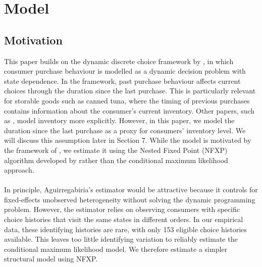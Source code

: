 \section{Model}
\subsection{Motivation}
This paper builds on the dynamic discrete choice framework by \cite{Agu2023}, in which consumer purchase behaviour is modelled as a dynamic decision problem with state dependence. In the framework, past purchase behaviour affects current choices through the duration since the last purchase. This is particularly relevant for storable goods such as canned tuna, where the timing of previous purchases contains information about the consumer’s current inventory. Other papers, such as \cite{HendelNevo2006}, model inventory more explicitly. However, in this paper, we model the duration since the last purchase as a proxy for consumers' inventory level. We will discuss this assumption later in Section 7. While the model is motivated by the framework of \cite{Agu2023}, we estimate it using the Nested Fixed Point (NFXP) algorithm developed by \cite{Rust1987} rather than the conditional maximum likelihood approach. 
\\
\\ 
In principle, Aguirregabiria’s estimator would be attractive because it controls for fixed-effects unobserved heterogeneity without solving the dynamic programming problem. However, the estimator relies on observing consumers with specific choice histories that visit the same states in different orders. In our empirical data, these identifying histories are rare, with only 153 eligible choice histories available. This leaves too little identifying variation to reliably estimate the conditional maximum likelihood model. We therefore estimate a simpler structural model using NFXP.




